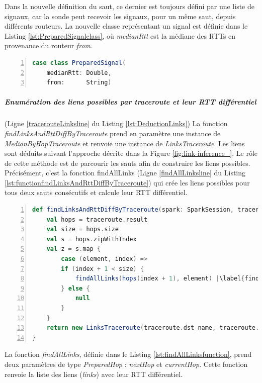 Dans la nouvelle définition du saut, ce dernier est toujours défini par une liste de signaux, car la sonde peut recevoir les signaux, pour un même saut, depuis différents routeurs. La nouvelle classe représentant un signal est définie dans le Listing \ref{lst:PreparedSignalclass}, où \textit{medianRtt} est la médiane des RTTs en provenance du routeur \textit{from}. 
\begin{lstlisting}[language=scala,firstnumber=1, caption={Définition de la classe PreparedSignal},label={lst:PreparedSignalclass}, basicstyle = \footnotesize,escapechar=|,numbers=left,
stepnumber=1] 
case class PreparedSignal(
	medianRtt: Double,
	from:      String)
\end{lstlisting}

\subparagraph{Enumération des liens possibles par traceroute et leur RTT différentiel} (Ligne \ref{tracerouteLinksline} du Listing \ref{lst:DeductionLinks})  La fonction \textit{findLinksAndRttDiffByTraceroute} prend en paramètre une instance de \textit{MedianByHopTraceroute} et renvoie une instance de \textit{LinksTraceroute}. Les liens sont déduits suivant l'approche décrite dans la Figure \ref{fig:link-inference_}. Le rôle de cette méthode est de parcourir les sauts afin de construire les liens possibles. Précisément, c'est la fonction findAllLinks (Ligne \ref{findAllLinksline} du Listing \ref{lst:functionfindLinksAndRttDiffByTraceroute}) qui crée les liens possibles pour tous deux sauts consécutifs et calcule leur RTT différentiel.

\begin{lstlisting}[language=scala,firstnumber=1, caption={Définition de la fonction findLinksAndRttDiffByTraceroute},label={lst:functionfindLinksAndRttDiffByTraceroute}, basicstyle = \footnotesize,escapechar=|,numbers=left,
stepnumber=1] 
  def findLinksAndRttDiffByTraceroute(spark: SparkSession, traceroute: MedianByHopTraceroute): LinksTraceroute = {
	val hops = traceroute.result
	val size = hops.size
	val s = hops.zipWithIndex
	val z = s.map {
		case (element, index) =>
		if (index + 1 < size) {
			findAllLinks(hops(index + 1), element) |\label{findAllLinksline}|
		} else {
			null
		}
	}
	return new LinksTraceroute(traceroute.dst_name, traceroute.from, traceroute.prb_id, traceroute.msm_id, traceroute.timestamp, z.filter(p => p != null).flatten)
}
\end{lstlisting}

 La fonction \textit{findAllLinks}, définie dans le Listing \ref{lst:findAllLinksfunction}, prend deux paramètres de type \textit{PreparedHop} : \textit{nextHop} et \textit{currentHop}. Cette fonction renvoie la liste des liens (\textit{links}) avec leur RTT différentiel. 
 
